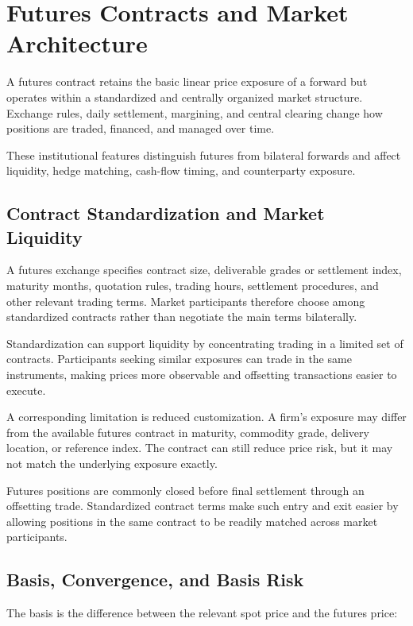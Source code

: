 \section{Futures Contracts and Market Architecture}

A futures contract retains the basic linear price exposure of a forward but operates within a standardized and centrally organized market structure. Exchange rules, daily settlement, margining, and central clearing change how positions are traded, financed, and managed over time.

These institutional features distinguish futures from bilateral forwards and affect liquidity, hedge matching, cash-flow timing, and counterparty exposure.

\subsection{Contract Standardization and Market Liquidity}

A futures exchange specifies contract size, deliverable grades or settlement index, maturity months, quotation rules, trading hours, settlement procedures, and other relevant trading terms. Market participants therefore choose among standardized contracts rather than negotiate the main terms bilaterally.

Standardization can support liquidity by concentrating trading in a limited set of contracts. Participants seeking similar exposures can trade in the same instruments, making prices more observable and offsetting transactions easier to execute.

A corresponding limitation is reduced customization. A firm's exposure may differ from the available futures contract in maturity, commodity grade, delivery location, or reference index. The contract can still reduce price risk, but it may not match the underlying exposure exactly.

Futures positions are commonly closed before final settlement through an offsetting trade. Standardized contract terms make such entry and exit easier by allowing positions in the same contract to be readily matched across market participants.

\subsection{Basis, Convergence, and Basis Risk}

The basis is the difference between the relevant spot price and the futures price:

